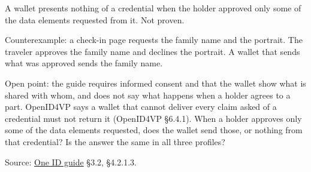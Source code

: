 \begin{theorem}
  \label{thm:partial-consent}
  A wallet presents nothing of a credential when the holder approved only some
  of the data elements requested from it.  Not proven.

  Counterexample: a check-in page requests the family name and the portrait.
  The traveler approves the family name and declines the portrait.  A wallet
  that sends what was approved sends the family name.

  Open point: the guide requires informed consent and that the wallet show what
  is shared with whom, and does not say what happens when a holder agrees to a
  part.  OpenID4VP says a wallet that cannot deliver every claim asked of a
  credential must not return it (OpenID4VP §6.4.1).  When a holder approves
  only some of the data elements requested, does the wallet send those, or
  nothing from that credential?  Is the answer the same in all three profiles?

  Source: \href{https://standards.atlassian.net/wiki/spaces/OneID/pages/2947416082/Technical+Implementation+Guide}{One ID guide} §3.2, §4.2.1.3.
\end{theorem}

